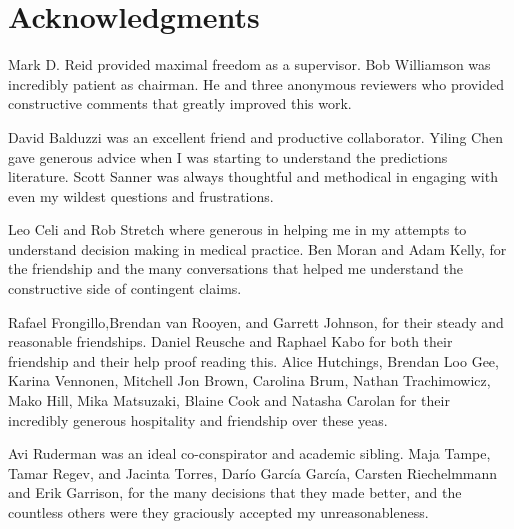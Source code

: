 \chapter*{Acknowledgments}

Mark D. Reid provided maximal freedom as a supervisor.
Bob Williamson was incredibly patient as chairman.
He and three anonymous reviewers who provided constructive comments that greatly improved this work.  

David Balduzzi was an excellent friend and productive collaborator.
Yiling Chen gave generous advice when I was starting to understand the predictions literature.
Scott Sanner was always thoughtful and methodical in engaging with even my wildest questions and frustrations.


Leo Celi and Rob Stretch where generous in helping me in my attempts to understand decision making in medical practice.
Ben Moran and Adam Kelly, for the friendship and the many conversations that helped me understand the constructive side of contingent claims.

Rafael Frongillo,Brendan van Rooyen, and Garrett Johnson, for their steady and reasonable friendships.
Daniel Reusche and Raphael Kabo for both their friendship and their help proof reading this.
Alice Hutchings, Brendan Loo Gee, Karina Vennonen, Mitchell Jon Brown, Carolina Brum, Nathan Trachimowicz, Mako Hill, Mika Matsuzaki, Blaine Cook and Natasha Carolan for their incredibly generous hospitality and friendship over these yeas.

Avi Ruderman was an ideal co-conspirator and academic sibling. 
Maja Tampe, Tamar Regev, and Jacinta Torres, Dar\'io Garc\'ia Garc\'ia, Carsten Riechelmmann and Erik Garrison, for the many decisions that they made better, and the countless others were they graciously accepted my unreasonableness. 


